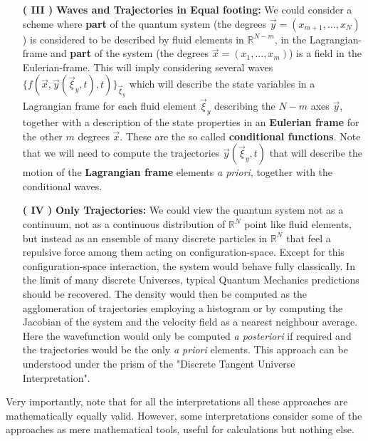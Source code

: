 \documentclass[11pt, a4paper]{article} %
\newcommand{\R}{\mathbb{R}} %
\begin{document}
\begin{enumerate}
\item[{\bf ( III )}]{\bf Waves and Trajectories in Equal footing: } We could consider a scheme where {\bf part} of the quantum system (the degrees $\vec{y}=(x_{m+1},...,x_N)$) is considered to be described by fluid elements in $\R^{N-m}$, in the Lagrangian-frame and {\bf part} of the system (the degrees $\vec{x}=(x_1,...,x_m)$) is a field in the Eulerian-frame. This will imply considering several waves $\{ f(\vec{x}, \vec{y}(\vec{\xi}_y,t), t) \}_{\vec{\xi}_y}$ which will describe the state variables in a Lagrangian frame for each fluid element $\vec{\xi}_y$ describing the $N-m$ axes $\vec{y}$, together with a description of the state properties in an {\bf Eulerian frame} for the other $m$ degrees $\vec{x}$. These are the so called {\bf conditional functions}. Note that we will need to compute the trajectories $\vec{y}(\vec{\xi}_y,t)$ that will describe the motion of the {\bf Lagrangian frame} elements {\em a priori}, together with the conditional waves. 


\item[\bf ( IV ) ]{\bf Only Trajectories: } We could view the quantum system not as a continuum, not as a continuous distribution of $\R^N$ point like fluid elements, but instead as an ensemble of many discrete particles in $\R^N$ that feel a repulsive force among them acting on configuration-space. Except for this configuration-space interaction, the system would behave fully classically. In the limit of many discrete Universes, typical Quantum Mechanics predictions should be recovered. The density would then be computed as the agglomeration of trajectories employing a histogram or by computing the Jacobian of the system and the velocity field as a nearest neighbour average. Here the wavefunction would only be computed {\em a posteriori} if required and the trajectories would be the only {\em a priori} elements. This approach can be understood under the prism of the "Discrete Tangent Universe Interpretation".\vspace{-0.3cm}
\end{enumerate}
Very importantly, note that for all the interpretations all these approaches are mathematically equally valid. However, some interpretations consider some of the approaches as mere mathematical tools, useful for calculations but nothing else.
\end{document}
